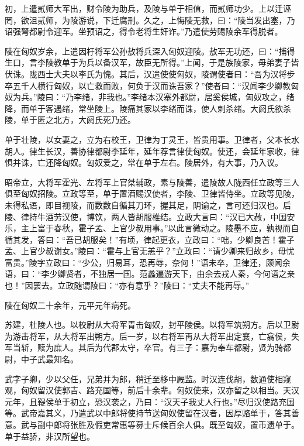 \documentclass[12pt,UTF8]{ctexbook}
\begin{document}
初，上遣贰师大军出，财令陵为助兵，及陵与单于相值，而贰师功少。上以迁诬罔，欲沮贰师，为陵游说，下迁腐刑。久之，上悔陵无救，曰：“陵当发出塞，乃诏强弩都尉令迎军。坐预诏之，得令老将生奸诈。”乃遣使劳赐陵余军得脱者。



陵在匈奴岁余，上遣因杅将军公孙敖将兵深入匈奴迎陵。敖军无功还，曰：“捕得生口，言李陵教单于为兵以备汉军，故臣无所得。”上闻，于是族陵家，母弟妻子皆伏诛。陇西士大夫以李氏为愧。其后，汉遣使使匈奴，陵谓使者曰：“吾为汉将步卒五千人横行匈奴，以亡救而败，何负于汉而诛吾家？”使者曰：“汉闻李少卿教匈奴为兵。”陵曰：“乃李绪，非我也。”李绪本汉塞外都尉，居奚侯城，匈奴攻之，绪降，而单于客遇绪，常坐陵上。陵痛其家以李绪而诛，使人刺杀绪。大阏氏欲杀陵，单于匿之北方，大阏氏死乃还。



单于壮陵，以女妻之，立为右校王，卫律为丁灵王，皆贵用事。卫律者，父本长水胡人。律生长汉，善协律都尉李延年，延年荐言律使匈奴。使还，会延年家收，律惧并诛，亡还降匈奴。匈奴爱之，常在单于左右。陵居外，有大事，乃入议。



昭帝立，大将军霍光、左将军上官桀辅政，素与陵善，遣陵故人陇西任立政等三人俱至匈奴招陵。立政等至，单于置酒赐汉使者，李陵、卫律皆侍坐。立政等见陵，未得私语，即目视陵，而数数自循其刀环，握其足，阴谕之，言可还归汉也。后陵、律持牛酒劳汉使，博饮，两人皆胡服椎结。立政大言曰：“汉已大赦，中国安乐，主上富于春秋，霍子孟、上官少叔用事。”以此言微动之。陵墨不应，孰视而自循其发，答曰：“吾已胡服矣！”有顷，律起更衣，立政曰：“咄，少卿良苦！霍子孟、上官少叔谢女。”陵曰：“霍与上官无恙乎？”立政曰：“请少卿来归故乡，毋忧富贵。”陵字立政曰：“少公，归易耳，恐再辱，奈何！”语未卒，卫律还，颇闻余语，曰：“李少卿贤者，不独居一国。范蠡遍游天下，由余去戎人秦，今何语之亲也！”因罢去。立政随谓陵曰：“亦有意乎？”陵曰：“丈夫不能再辱。”



陵在匈奴二十余年，元平元年病死。



苏建，杜陵人也。以校尉从大将军青击匈奴，封平陵侯。以将军筑朔方。后以卫尉为游击将军，从大将军出朔方。后一岁，以右将军再从大将军出定襄，亡翕侯，失军当斩，赎为庶人。其后为代郡太守，卒官。有三子：嘉为奉车都尉，贤为骑都尉，中子武最知名。



武字子卿，少以父任，兄弟并为郎，稍迁至栘中厩监。时汉连伐胡，数通使相窥观，匈奴留汉使郭吉、路充国等，前后十余辈。匈奴使来，汉亦留之以相当。天汉元年，且鞮侯单于初立，恐汉袭之，乃曰：“汉天子我丈人行也。”尽归汉使路充国等。武帝嘉其义，乃遣武以中郎将使持节送匈奴使留在汉者，因厚赂单于，答其善意。武与副中郎将张胜及假吏常惠等募士斥候百余人俱。既至匈奴，置币遗单于。单于益骄，非汉所望也。
\end{document}
